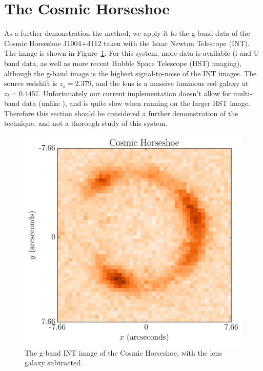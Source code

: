 \documentclass[useAMS,usenatbib]{mn2e}
\begin{document}
\section{The Cosmic Horseshoe}
As a further demonstration the method, we apply it to the g-band data
of the Cosmic Horseshoe J1004+4112 \citep{belokurov, 2008MNRAS.388..384D} taken with the Isaac Newton Telescope (INT). The image is shown in Figure~\ref{fig:image3}.
For this system,
more data is available (i and U band data, as well as more recent
Hubble Space Telescope (HST) imaging), although the g-band image is the highest
signal-to-noise of the INT images. The source redshift is $z_s=2.379$, and the
lens is a massive luminous red galaxy at $z_l=0.4457$.
Unfortunately our current implementation
doesn't allow for multi-band data (unlike \citet{2011MNRAS.412.2521B}), and
is quite slow when running on the larger HST image. Therefore this section
should be considered a further demonstration of the technique, and not a
thorough study of this system.

\begin{figure}
\begin{center}
\includegraphics[scale=0.5]{image3.pdf}
\caption{The g-band INT image of the Cosmic Horseshoe, with the lens galaxy
subtracted.
\label{fig:image3}}
\end{center}
\end{figure}
\end{document}

